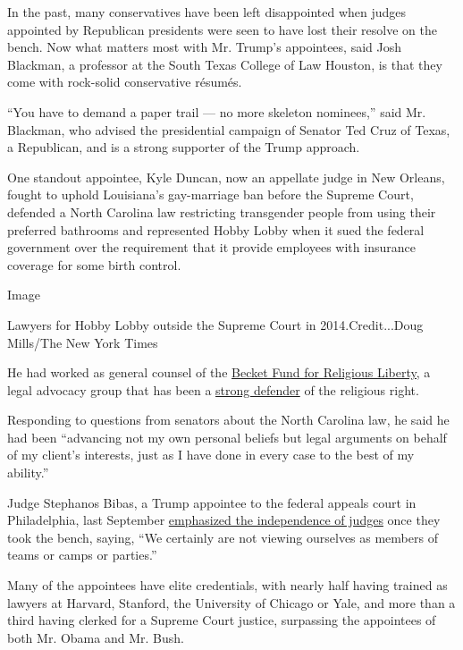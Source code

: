 In the past, many conservatives have been left disappointed when judges
appointed by Republican presidents were seen to have lost their resolve
on the bench. Now what matters most with Mr. Trump's appointees, said
Josh Blackman, a professor at the South Texas College of Law Houston, is
that they come with rock-solid conservative résumés.

``You have to demand a paper trail --- no more skeleton nominees,'' said
Mr. Blackman, who advised the presidential campaign of Senator Ted Cruz
of Texas, a Republican, and is a strong supporter of the Trump approach.

One standout appointee, Kyle Duncan, now an appellate judge in New
Orleans, fought to uphold Louisiana's gay-marriage ban before the
Supreme Court, defended a North Carolina law restricting transgender
people from using their preferred bathrooms and represented Hobby Lobby
when it sued the federal government over the requirement that it provide
employees with insurance coverage for some birth control.

Image

Lawyers for Hobby Lobby outside the Supreme Court in 2014.Credit...Doug
Mills/The New York Times

He had worked as general counsel of the
\href{https://www.becketlaw.org/about-us/history/}{Becket Fund for
Religious Liberty,} a legal advocacy group that has been a
\href{https://www.washingtonpost.com/politics/becket-fund-law-firm-gaining-a-reputation-as-powerhouse-after-hobby-lobby-win/2014/07/20/c28931a4-104c-11e4-8936-26932bcfd6ed_story.html}{strong
defender} of the religious right.

Responding to questions from senators about the North Carolina law, he
said he had been ``advancing not my own personal beliefs but legal
arguments on behalf of my client's interests, just as I have done in
every case to the best of my ability.''

Judge Stephanos Bibas, a Trump appointee to the federal appeals court in
Philadelphia, last September
\href{https://www.wsj.com/articles/judges-say-they-arent-extensions-of-presidents-who-appointed-them-11568566598}{emphasized
the independence of judges} once they took the bench, saying, ``We
certainly are not viewing ourselves as members of teams or camps or
parties.''

Many of the appointees have elite credentials, with nearly half having
trained as lawyers at Harvard, Stanford, the University of Chicago or
Yale, and more than a third having clerked for a Supreme Court justice,
surpassing the appointees of both Mr. Obama and Mr. Bush.

